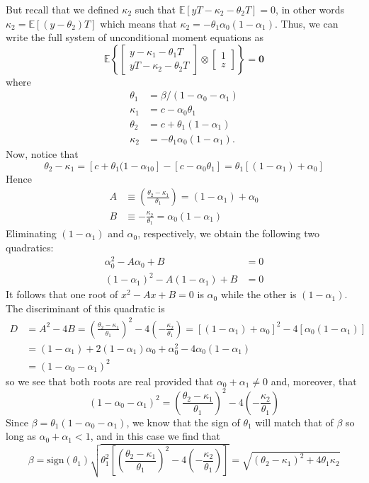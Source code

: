 \documentclass[12pt]{article}
\begin{document}
But recall that we defined $\kappa_2$ such that $\mathbb{E}[yT - \kappa_2 - \theta_2 T] = 0$, in other words $\kappa_2 = \mathbb{E}[(y - \theta_2)T]$ which means that $\kappa_2 = -\theta_1 \alpha_0(1 - \alpha_1)$.
Thus, we can write the full system of unconditional moment equations as
\[
  \mathbb{E}\left\{ \left[
    \begin{array}{c}
    y - \kappa_1 - \theta_1 T \\ 
    yT - \kappa_2 - \theta_2 T
  \end{array}
\right]\otimes
\left[
\begin{array}{cc}
1 \\ z
\end{array}
\right]\right\} = \mathbf{0}
\]
where
\begin{align*}
  \theta_1 &= \beta / (1 - \alpha_0 - \alpha_1) \\
  \kappa_1 &= c - \alpha_0 \theta_1\\
  \theta_2 &= c + \theta_1 (1 - \alpha_1)\\
  \kappa_2 &= -\theta_1 \alpha_0 (1 - \alpha_1).
\end{align*}
Now, notice that
\[
  \theta_2 - \kappa_1 = \left[ c + \theta_1 (1 - \alpha_10 \right] - \left[ c - \alpha_0 \theta_1 \right] = \theta_1 \left[ (1 - \alpha_1) + \alpha_0 \right]
\]
Hence
\begin{align}
  \label{eq:IdentExog1}
  A &\equiv \left(\frac{\theta_2 - \kappa_1}{\theta_1}\right) = (1 - \alpha_1) + \alpha_0\\
  B &\equiv -\frac{\kappa_2}{\theta_1} = \alpha_0 (1 - \alpha_1)
\end{align}
Eliminating $(1 - \alpha_1)$ and $\alpha_0$, respectively, we obtain the following two quadratics:
\begin{align}
  \alpha_0^2 - A \alpha_0 + B &= 0\\
  (1 - \alpha_1)^2 - A (1 - \alpha_1) + B &= 0
\end{align}
It follows that one root of $x^2 - Ax + B = 0$ is $\alpha_0$ while the other is $(1 - \alpha_1)$.
The discriminant of this quadratic is
\begin{align*}
  D &= A^2 - 4 B  = \left( \frac{\theta_2 - \kappa_1}{\theta_1} \right)^2 - 4 \left( -\frac{\kappa_2}{\theta_1} \right) = [(1 - \alpha_1) + \alpha_0]^2 - 4 [\alpha_0 (1 - \alpha_1)]\\
  &= (1 - \alpha_1) + 2(1 - \alpha_1)\alpha_0 + \alpha_0^2 - 4\alpha_0 (1 - \alpha_1)\\
  &= (1 - \alpha_0 - \alpha_1)^2
\end{align*}
so we see that both roots are real provided that $\alpha_0 + \alpha_1 \neq 0$ and, moreover, that
\[
  (1 - \alpha_0 - \alpha_1)^2 = \left( \frac{\theta_2 - \kappa_1}{\theta_1} \right)^2 - 4 \left( -\frac{\kappa_2}{\theta_1} \right)
\]
Since $\beta = \theta_1 (1 - \alpha_0 - \alpha_1)$, we know that the sign of $\theta_1$ will match that of $\beta$ so long as $\alpha_0 + \alpha_1 < 1$, and in this case we find that
\[
  \beta = \mbox{sign}(\theta_1) \sqrt{\theta_1^2\left[ \left( \frac{\theta_2 - \kappa_1}{\theta_1} \right)^2 - 4 \left( -\frac{\kappa_2}{\theta_1} \right)
 \right]} = \sqrt{(\theta_2 - \kappa_1)^2 + 4 \theta_1 \kappa_2}
\]
\end{document}
